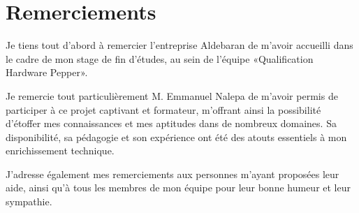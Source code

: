 \chapter*{Remerciements}

Je tiens tout d'abord à remercier l'entreprise Aldebaran de m'avoir accueilli dans le cadre de mon stage de fin d'études, au sein de l'équipe «Qualification Hardware Pepper».
\newline 

Je remercie tout particulièrement M. Emmanuel Nalepa de m'avoir permis de participer à ce projet captivant et formateur, m’offrant ainsi la possibilité d'étoffer mes connaissances et mes aptitudes dans de nombreux domaines. Sa disponibilité, sa pédagogie et son expérience ont été des atouts essentiels à mon enrichissement technique.
\newline

J’adresse également mes remerciements aux personnes m'ayant proposées leur aide, ainsi qu'à tous les membres de mon équipe pour leur bonne humeur et leur sympathie.